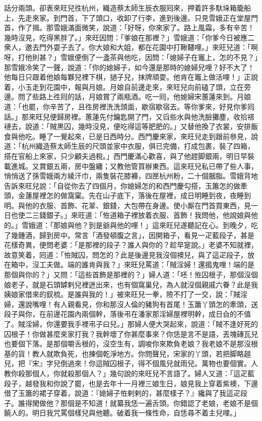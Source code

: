 話分兩頭。卻表來旺兒徃杭州，織造蔡太師生辰衣服囘來，押着許多馱垛箱籠船上，先走來家。到門首，下了頭口，收卸了行李，進到後邊。只見雪娥正在堂屋門首，作了揖。那雪娥滿面微笑，{}說道：「好呀，你來家了。{}路上風霜，多有辛苦！幾時沒見，吃得黑胖了。」來旺因問：「爹娘在那裡？」雪娥道：「你爹今日被應二衆人，邀去門外耍子去了。你大娘和大姐，都在花園中打鞦韆哩。」來旺兒道：「啊呀，打他則甚？」雪娥便倒了一盞茶與他吃，因問：「媳婦子在竈上，怎的不見？」那雪娥冷笑了一聲，說道：「你的媳婦子，如今還是那時的媳婦兒哩？好不大了！他每日只跟着他娘每夥兒裡下棋，撾子兒，抹牌頑耍。他肯在竈上做活哩！」正說着，小玉走到花園中，報與月娘。月娘自前邊走來，來旺兒向前磕了頭，立在旁邊。問了些路上徃囘的話，月娘賞了兩瓶酒。吃一囘，他媳婦宋蕙蓮來到。月娘道：「也罷，你辛苦了，且徃房裡洗洗頭面，歇宿歇宿去。等你爹來，好見你爹囘話。」那來旺兒便歸房裡。蕙蓮先付鑰匙開了門，又舀些水與他洗臉攤塵，收拾褡褳去，說道：「賊黑囚，幾時沒見，便吃得這等肥肥的。」又替他換了衣裳，安排飯食與他吃。睡了一覺起來，已是日西時分。西門慶來家，來旺兒走到跟前叅見，說道：「杭州織造蔡太師生辰的尺頭並家中衣服，俱已完備，打成包裹，裝了四箱，搭在官船上來家，只少顧夫過稅。」西門慶滿心歡喜，與了他趕脚銀兩，明日早裝載進城。又賞銀五兩，房中盤纏；又教他管買辦東西。{}這來旺兒私已帶了些人事，悄悄送了孫雪娥兩方綾汗巾，兩隻裝花膝褲，四匣杭州粉，二十個胭脂。{}雪娥背地告訴來旺兒說：「自從你去了四個月，你媳婦怎的和西門慶勾搭，玉簫怎的做牽頭，金蓮屋裡怎的做窩窠。先在山子底下，落後在屋裡，成日明睡到夜，夜睡到明。與他的衣服、首飾、花翠、銀錢，大包帶在身邊。使小厮在門首買東西，見一日也使二三錢銀子。」來旺道：「恠道箱子裡放着衣服、首飾！我問他，他說娘與他的。」雪娥道：「那娘與他？到是爺與他的哩！」{}這來旺兒遂聽記在心。到晚夕，吃了幾鍾酒，歸到房中。常言「酒發頓腹之言」，因開箱子，看見一疋藍段子，甚是花樣奇異，便問老婆：「是那裡的段子？誰人與你的？趁早寔說。」老婆不知就裡，故意笑着，囘道：「恠賊囚，問怎的？此是後邊見我沒個襖兒，與了這疋段子，放在箱中，沒工夫做。端的誰肯與我？」來旺兒罵道：「賊淫婦！還搗鬼哩！端的是那個與你的？」又問：「這些首飾是那裡的？」婦人道：「呸！恠囚根子，那個沒個娘老子，就是石頭罅剌兒裡迸出來，也有個窩巢兒，為人就沒個親戚六眷？此是我姨娘家借來的釵梳。是誰與我的！」被來旺兒一拳，險不打了一交，{}說：「賊淫婦，還說嘴哩！有人親看見，你和那沒人倫的豬狗有首尾！玉簫丫頭怎的牽頭，送段子與你，在前邊花園內兩個幹，落後弔在潘家那淫婦屋裡明幹，成日㒲的不值了。賊淫婦，你還要我手裡弔子曰兒。」那婦人便大哭起來，說道：「賊不逢好死的囚根子！你做甚麼來家打我？我幹壞了你甚麼事來？你恁是言不是語，丟塊磚瓦兒也要個下落。是那個嚼舌根的，沒空生有，調唆你來欺負老娘？{}我老娘不是那沒根基的貨！教人就欺負死，也揀個乾淨地方。你問聲兒，宋家的丫頭，若把脚略趄兒，把『宋』字兒倒過來！你這賊囚根子，得不個風兒就雨兒。萬物也要個實。人教你殺那個人，你就殺那個人？」幾句說的來旺兒不言語了。婦人又道：「這疋藍段子，越發我和你說了罷，也是去年十一月裡三娘生日，娘見我上穿着紫襖，下邊借了玉簫的裙子穿着，說道：『媳婦子恠剌剌的，甚麼樣子？』纔與了我這疋段子。誰得閑做他？那個是不知道！就纂我恁一遍舌頭。你錯認了老娘，老娘不是個饒人的。明日我咒罵個樣兒與他聽。破着我一條性命，自恁尋不着主兒哩。」